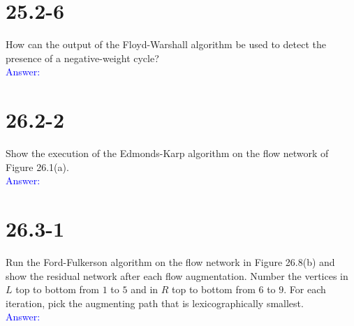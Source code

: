 \documentclass[a4paper]{article}
\begin{document}
\section{25.2-6} How can the output of the Floyd-Warshall algorithm be used to detect the presence of a negative-weight cycle?\\
\textcolor{blue}{Answer:}

\section{26.2-2} Show the execution of the Edmonds-Karp algorithm on the flow network of Figure 26.1(a).\\
\textcolor{blue}{Answer:}

\section{26.3-1} Run the Ford-Fulkerson algorithm on the flow network in Figure 26.8(b) and show the residual network after each flow augmentation. Number the vertices in $L$ top to bottom from $1$ to $5$ and in $R$ top to bottom from $6$ to $9$. For each iteration, pick the augmenting path that is lexicographically smallest.\\
\textcolor{blue}{Answer:}
\end{document}
